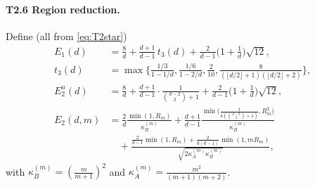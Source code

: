 \documentclass[11pt]{article}
\theoremstyle{definition}
\theoremstyle{remark}
\begin{document}
\paragraph{T2.6 Region reduction.} Define (all from \eqref{eq:T2star})
\begin{align*}
E_1(d)&=\frac8d+\frac{d+1}{d-1}\,t_3(d)+\frac{2}{d-1}\Big(1+\frac1d\Big)\sqrt{12},\\ t_3(d)&=\max\Big\{\frac{1/3}{1-1/d},\frac{1/6}{1-2/d},\frac2{10},\frac{8}{(\lfloor d/2\rfloor+1)(\lfloor d/2\rfloor+2)}\Big\},\\
E_2^u(d)&=\frac8d+\frac{d+1}{d-1}\cdot\frac1{\binom{d-2}2+1}+\frac2{d-1}\Big(1+\frac1d\Big)\sqrt{12},\\
E_2(d,m)&=\frac{2}{d}\frac{\min(1,R_m)}{\kappa_B^{(m)}}+\frac{d+1}{d-1}\frac{\min\big(\frac1{4(\binom{d-2}2+1)},R_m^2\big)}{\kappa_B^{(m)}}\\
&\quad+\frac{\frac2{d-1}\min(1,R_m)+\frac2{d(d-1)}\min(1,mR_m)}{\sqrt{2\kappa_A^{(m)}\kappa_B^{(m)}}},
\end{align*}
with $\kappa_B^{(m)}=(\frac m{m+1})^2$ and $\kappa_A^{(m)}=\frac{m^2}{(m+1)(m+2)}$.
\end{document}
